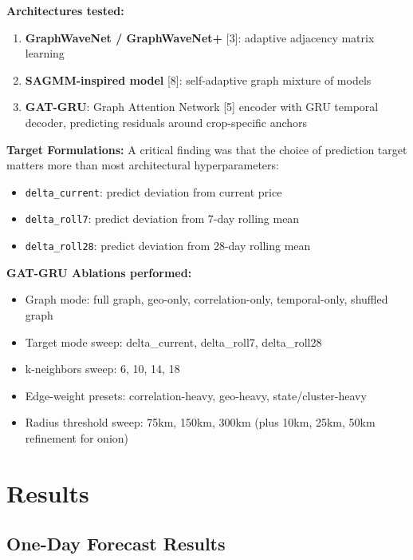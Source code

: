 \documentclass[12pt]{article}
\begin{document}
\textbf{Architectures tested:}

\begin{enumerate}
\item \textbf{GraphWaveNet / GraphWaveNet+} [3]: adaptive adjacency matrix learning
\item \textbf{SAGMM-inspired model} [8]: self-adaptive graph mixture of models
\item \textbf{GAT-GRU}: Graph Attention Network [5] encoder with GRU temporal decoder, predicting residuals around crop-specific anchors
\end{enumerate}

\textbf{Target Formulations:} A critical finding was that the choice of prediction target matters more than most architectural hyperparameters:

\begin{itemize}
\item \texttt{delta\_current}: predict deviation from current price
\item \texttt{delta\_roll7}: predict deviation from 7-day rolling mean
\item \texttt{delta\_roll28}: predict deviation from 28-day rolling mean
\end{itemize}

\textbf{GAT-GRU Ablations performed:}

\begin{itemize}
\item Graph mode: full graph, geo-only, correlation-only, temporal-only, shuffled graph
\item Target mode sweep: delta\_current, delta\_roll7, delta\_roll28
\item k-neighbors sweep: 6, 10, 14, 18
\item Edge-weight presets: correlation-heavy, geo-heavy, state/cluster-heavy
\item Radius threshold sweep: 75km, 150km, 300km (plus 10km, 25km, 50km refinement for onion)
\end{itemize}

\section{Results}

\subsection{One-Day Forecast Results}
\end{document}
